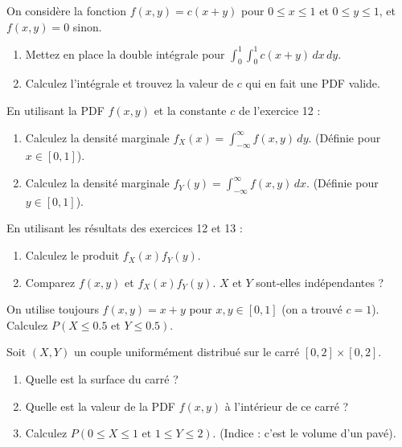 
\begin{exercicebox}
On considère la fonction $f(x, y) = c(x+y)$ pour $0 \le x \le 1$ et $0 \le y \le 1$, et $f(x,y)=0$ sinon.
\begin{enumerate}
    \item Mettez en place la double intégrale pour $\int_0^1 \int_0^1 c(x+y) \, dx \, dy$.
    \item Calculez l'intégrale et trouvez la valeur de $c$ qui en fait une PDF valide.
\end{enumerate}
\end{exercicebox}

\begin{exercicebox}
En utilisant la PDF $f(x,y)$ et la constante $c$ de l'exercice 12 :
\begin{enumerate}
    \item Calculez la densité marginale $f_X(x) = \int_{-\infty}^{\infty} f(x, y) \, dy$. (Définie pour $x \in [0, 1]$).
    \item Calculez la densité marginale $f_Y(y) = \int_{-\infty}^{\infty} f(x, y) \, dx$. (Définie pour $y \in [0, 1]$).
\end{enumerate}
\end{exercicebox}

\begin{exercicebox}
En utilisant les résultats des exercices 12 et 13 :
\begin{enumerate}
    \item Calculez le produit $f_X(x) f_Y(y)$.
    \item Comparez $f(x,y)$ et $f_X(x) f_Y(y)$. $X$ et $Y$ sont-elles indépendantes ?
\end{enumerate}
\end{exercicebox}

\begin{exercicebox}
On utilise toujours $f(x,y) = x+y$ pour $x, y \in [0, 1]$ (on a trouvé $c=1$).
Calculez $P(X \le 0.5 \text{ et } Y \le 0.5)$.
\end{exercicebox}

\begin{exercicebox}
Soit $(X, Y)$ un couple uniformément distribué sur le carré $[0, 2] \times [0, 2]$.
\begin{enumerate}
    \item Quelle est la surface du carré ?
    \item Quelle est la valeur de la PDF $f(x, y)$ à l'intérieur de ce carré ?
    \item Calculez $P(0 \le X \le 1 \text{ et } 1 \le Y \le 2)$. (Indice : c'est le volume d'un pavé).
\end{enumerate}
\end{exercicebox}


